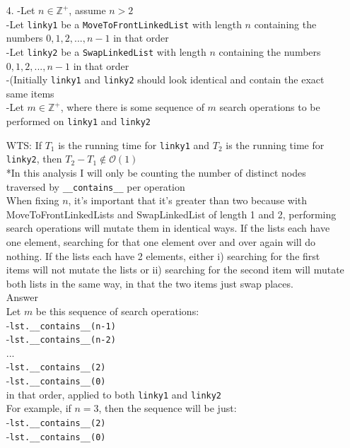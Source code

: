 \documentclass[fontsize=11pt]{article}
\begin{document}
\begin{enumerate}
\begin{enumerate}
\end{enumerate}

\item[4.]
    -Let $n \in \mathbb{Z}^+$, assume $n > 2$ \\
    -Let \texttt{linky1} be a \texttt{MoveToFrontLinkedList} with length $n$ containing the numbers $0, 1, 2,..., n-1$ in that order \\
    -Let \texttt{linky2} be a \texttt{SwapLinkedList} with length $n$ containing the numbers $0, 1, 2,..., n-1$ in that order \\
    -(Initially \texttt{linky1} and \texttt{linky2} should look identical and contain the exact same items\\
    -Let $m \in \mathbb{Z}^+$, where there is some sequence of $m$ search operations to be performed on \texttt{linky1} and \texttt{linky2}

    WTS: If $T_1$  is the running time for \texttt{linky1} and $T_2$ is the running time for \texttt{linky2}, then $T_2 - T_1 \notin \mathcal{O}(1)$ \\
    *In this analysis I will only be counting the number of distinct nodes traversed by \texttt{\_\_contains\_\_} per operation\\

    When fixing $n$, it's important that it's greater than two because with MoveToFrontLinkedLists and SwapLinkedList of length 1 and 2, performing search operations will mutate them in identical ways. If the lists each have one element, searching for that one element over and over again will do nothing. If the lists each have 2 elements, either i) searching for the first items will not mutate the lists or ii) searching for the second item will mutate both lists in the same way, in that the two items just swap places.\\

    Answer\\
    Let $m$ be this sequence of search operations:\\
    -\texttt{lst.\_\_contains\_\_(n-1)} \\
    -\texttt{lst.\_\_contains\_\_(n-2)} \\
    ...\\
    -\texttt{lst.\_\_contains\_\_(2)} \\
    -\texttt{lst.\_\_contains\_\_(0)} \\
    in that order, applied to both \texttt{linky1} and \texttt{linky2}\\

    For example, if $n=3$, then the sequence will be just:\\
    -\texttt{lst.\_\_contains\_\_(2)} \\
    -\texttt{lst.\_\_contains\_\_(0)} \\


\end{enumerate}
\end{document}
